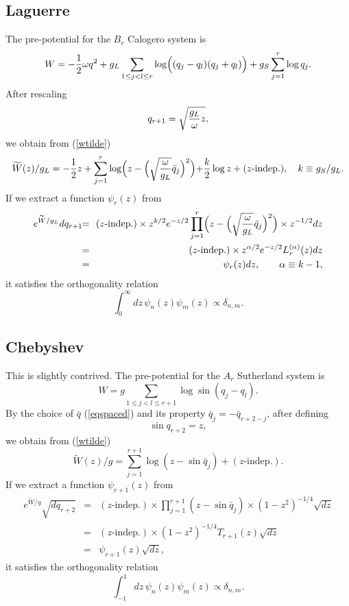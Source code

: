 \documentclass[a4paper,12pt]{article}
\begin{document}
\subsection{Laguerre}

The pre-potential for the $B_r$ Calogero system is
\[
   W=-\frac12\omega q^2+g_L\sum_{1\leq j<l\leq r}
   \log\Bigl((q_j-q_l)(q_j+q_l)\Bigr)+g_S\sum_{j=1}^r\log q_j.
\]
After rescaling
\begin{equation}
   q_{r+1}=\sqrt{{g_L\over{\omega}}z},
\end{equation}
we obtain from (\ref{wtilde})
\begin{equation}
   \widetilde{W}(z)/g_L= -\frac12z+\sum_{j=1}^r\log\Bigl(
   z-\Bigl(\sqrt{\frac{\omega}{g_L}}\bar{q}_j\Bigl)^2\Bigl)
   +\frac{k}{2}\log z+(\mbox{$z$-indep.}), \quad k\equiv g_S/g_L.
\end{equation}
If we extract a function $\psi_{r}(z)$ from
\begin{eqnarray}
   e^{\widetilde{W}/g_L}dq_{r+1}&\!\!=\!\!&(\mbox{$z$-indep.})\times
   z^{k/2}e^{-z/2}\prod_{j=1}^r\Bigl(
   z-\Bigl(\sqrt{\frac{\omega}{g_L}}\bar{q}_j\Bigr)^2\Bigr)
   \times z^{-1/2}dz\nonumber\\
%
   &\!\!=\!\!&(\mbox{$z$-indep.})\times
   z^{\alpha/2}e^{-z/2}L^{(\alpha)}_r(z)dz\nonumber\\
%
   &\!\!=\!\!&\psi_r(z)dz,\qquad \alpha\equiv k-1,
   \label{psiBr}
\end{eqnarray}
it satisfies the orthogonality relation
\[
   \int_0^{\infty}dz\,\psi_n(z)\psi_m(z)\propto\delta_{n,m}.
\]

\subsection{Chebyshev}

This is slightly contrived.
The pre-potential for the $A_r$ Sutherland system is
\[
   W=g\sum_{1\leq j<l\leq r+1}\log\sin(q_j-q_l).
\]
By the choice of $\bar{q}$ (\ref{eqspaced}) and its property
$\bar{q}_j=-\bar{q}_{r+2-j}$, after defining
\begin{equation}
   \sin{q_{r+2}}=z,
\end{equation}
we obtain from (\ref{wtilde})
\begin{equation}
   \widetilde{W}(z)/g=\sum_{j=1}^{r+1}\log(z-\sin\bar{q}_j)+(\mbox{$z$-indep.}).
\end{equation}
If we extract a function $\psi_{r+1}(z)$ from
\begin{eqnarray}
   e^{\widetilde{W}/g}\sqrt{dq_{r+2}}&\!\!=\!\!&(\mbox{$z$-indep.})\times
   \prod_{j=1}^{r+1}(z-\sin\bar{q}_j)\times(1-z^2)^{-1/4}\sqrt{dz}\nonumber\\
%
   &\!\!=\!\!&(\mbox{$z$-indep.})\times
   (1-z^2)^{-1/4}T_{r+1}(z)\sqrt{dz}\nonumber\\
%
   &\!\!=\!\!&\psi_{r+1}(z)\sqrt{dz},
   \label{psiAr2}
\end{eqnarray}
it satisfies the orthogonality relation
\[
   \int_{-1}^1dz\,\psi_n(z)\psi_m(z)\propto\delta_{n,m}.
\]
\end{document}

